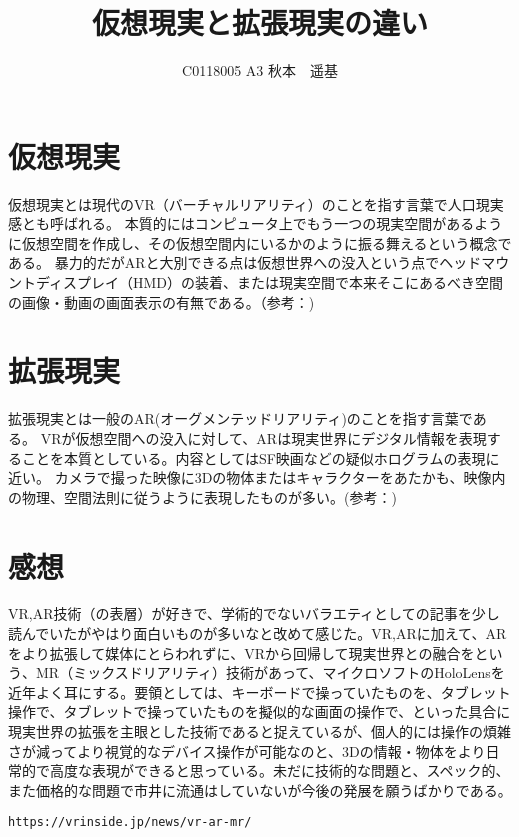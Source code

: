 \documentclass[uplatex]{jsarticle} %
\title{仮想現実と拡張現実の違い}
\author{C0118005 A3 秋本　遥基}
\date{}
\begin{document}
\maketitle


\section{仮想現実}

  仮想現実とは現代のVR（バーチャルリアリティ）のことを指す言葉で人口現実感とも呼ばれる。
  本質的にはコンピュータ上でもう一つの現実空間があるように仮想空間を作成し、その仮想空間内にいるかのように振る舞えるという概念である。
  暴力的だがARと大別できる点は仮想世界への没入という点でヘッドマウントディスプレイ（HMD）の装着、または現実空間で本来そこにあるべき空間の画像・動画の画面表示の有無である。（参考：\cite{source})

\section{拡張現実}

  拡張現実とは一般のAR(オーグメンテッドリアリティ)のことを指す言葉である。
  VRが仮想空間への没入に対して、ARは現実世界にデジタル情報を表現することを本質としている。内容としてはSF映画などの疑似ホログラムの表現に近い。
  カメラで撮った映像に3Dの物体またはキャラクターをあたかも、映像内の物理、空間法則に従うように表現したものが多い。(参考：\cite{source})

\section{感想}

  VR,AR技術（の表層）が好きで、学術的でないバラエティとしての記事を少し読んでいたがやはり面白いものが多いなと改めて感じた。VR,ARに加えて、ARをより拡張して媒体にとらわれずに、VRから回帰して現実世界との融合をという、MR（ミックスドリアリティ）技術があって、マイクロソフトのHoloLensを近年よく耳にする。要領としては、キーボードで操っていたものを、タブレット操作で、タブレットで操っていたものを擬似的な画面の操作で、といった具合に現実世界の拡張を主眼とした技術であると捉えているが、個人的には操作の煩雑さが減ってより視覚的なデバイス操作が可能なのと、3Dの情報・物体をより日常的で高度な表現ができると思っている。未だに技術的な問題と、スペック的、また価格的な問題で市井に流通はしていないが今後の発展を願うばかりである。

\begin{thebibliography}{99}
   \verb+https://vrinside.jp/news/vr-ar-mr/+
\end{thebibliography}
\end{document}
